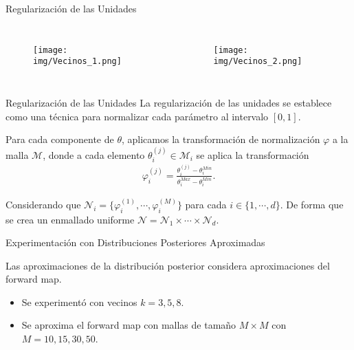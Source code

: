 \documentclass[10pt,aspectratio=169]{beamer}
\begin{document}
\begin{frame}{Regularización de las Unidades}
  \begin{columns}[T,onlytextwidth]
    
    \begin{figure}
      \centering 
      \texttt{[image: img/Vecinos\_1.png]}
    \end{figure} 
    
    
      
    \begin{figure}
      \centering 
      \texttt{[image: img/Vecinos\_2.png]}
    \end{figure} 
    
  \end{columns}
\end{frame}

\begin{frame}{Regularización de las Unidades}
  La regularización de las unidades se establece como una técnica para normalizar cada parámetro al intervalo $[0,1]$. 

  Para cada componente de $\theta$, aplicamos la transformación de normalización $\varphi$ a la malla $\mathcal{M}$, donde a cada elemento $\theta_i^{(j)}\in \mathcal{M}_i$ se aplica la transformación
  \begin{align}
      \varphi_i^{(j)} = \frac{\theta_i^{(j)} - \theta_i^{Min}}{\theta_i^{Max}-\theta_i^{Min}}.
      \label{3.3.02}
  \end{align}

  Considerando que $\mathcal{N}_i = \{\varphi_i^{(1)},\cdots, \varphi_i^{(M)}\}$ para cada $i \in \{1,\cdots,d\}$.  De forma que se crea un enmallado uniforme $\mathcal{N} = \mathcal{N}_1 \times \cdots \times \mathcal{N}_d$.
\end{frame}

\begin{frame}{Experimentación con Distribuciones Posteriores Aproximadas}

  Las aproximaciones de la distribución posterior considera aproximaciones del forward map. 
  
  \begin{itemize}
    \item 
    Se experimentó con vecinos $k = 3,5,8$. 
    \item 
    Se aproxima el forward map con mallas de tamaño $M \times M$ con $M = 10, 15, 30, 50$.
  \end{itemize}

\end{frame}
\end{document}
